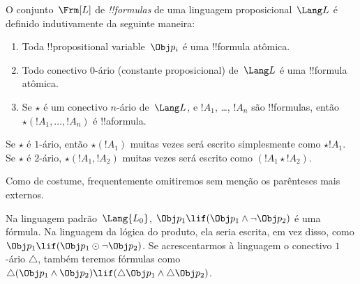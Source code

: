\documentclass[../../../include/open-logic-section]{subfiles}
\begin{document}


\begin{defn}[Fórmula]
O conjunto~$\Frm[L]$ de \emph{!!{formula}s} de uma linguagem
proposicional~$\Lang L$ é definido indutivamente da seguinte maneira:
\begin{enumerate}
\item Toda !!{propositional variable}~$\Obj p_i$ é uma
  !!{formula} atômica.
\item Todo conectivo $0$-ário (constante proposicional) de~$\Lang L$
é uma !!{formula} atômica.
\item Se $\star$ é um conectivo $n$-ário de~$\Lang L$, e $!A_1$,
\dots, $!A_n$ são !!{formula}s, então $\star(!A_1, \dots, !A_n)$ é
  !!a{formula}.
\end{enumerate}
Se $\star$ é $1$-ário, então $\star(!A_1)$ muitas vezes será escrito
simplesmente como $\star !A_1$. Se $\star$ é $2$-ário, $\star(!A_1,!A_2)$
muitas vezes será escrito como $(!A_1 \star !A_2)$. 
\end{defn}

Como de costume, frequentemente omitiremos sem menção os parênteses mais externos.

\begin{ex}
  Na linguagem padrão~$\Lang{L_0}$, $\Obj p_1 \lif (\Obj p_1
  \land \lnot \Obj p_2)$ é uma fórmula. Na linguagem da lógica do produto,
  ela seria escrita, em vez disso, como $\Obj p_1 \lif (\Obj p_1 \odot
  \lnot \Obj p_2)$. Se acrescentarmos à linguagem o conectivo $1$-ário $\triangle$,
  também teremos fórmulas como $\triangle (\Obj p_1
  \land \Obj p_2) \lif (\triangle \Obj p_1 \land \triangle \Obj p_2)$.
\end{ex}
\end{document}
